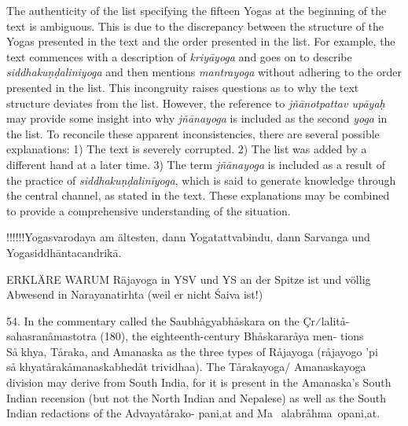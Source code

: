 {The authenticity of the list specifying the fifteen Yogas at the beginning of the text is ambiguous. This is due to the discrepancy between the structure of the Yogas presented in the text and the order presented in the list. For example, the text commences with a description of \textit{kriyāyoga} and goes on to describe \textit{siddhakuṇḍaliniyoga} and then mentions \textit{mantrayoga} without adhering to the order presented in the list. This incongruity raises questions as to why the text structure deviates from the list. However, the reference to \textit{jñānotpattav upāyaḥ} may provide some insight into why \textit{jñānayoga} is included as the second \textit{yoga} in the list. To reconcile these apparent inconsistencies, there are several possible explanations: 1) The text is severely corrupted. 2) The list was added by a different hand at a later time. 3) The term \textit{jñānayoga} is included as a result of the practice of \textit{siddhakuṇḍalinīyoga}, which is said to generate knowledge through the central channel, as stated in the text. These explanations may be combined to provide a comprehensive understanding of the situation.


!!!!!!Yogasvarodaya am ältesten, dann Yogatattvabindu, dann Sarvanga und Yogasiddhāntacandrikā.  

ERKLÄRE WARUM Rājayoga in YSV und YS an der Spitze ist und völlig Abwesend in Narayanatirhta (weil er nicht Śaiva ist!)

54. In the commentary called the Saubhågyabhåskara on the Çr⁄lalitå-
sahasranåmastotra (180), the eighteenth-century Bhåskararåya men-
tions Såkhya, Tåraka, and Amanaska as the three types of Råjayoga
(råjayogo ’pi såkhyatårakåmanaskabhedåt trividhaa). The Tårakayoga/
Amanaskayoga division may derive from South India, for it is present in
the Amanaska’s South Indian recension (but not the North Indian and
Nepalese) as well as the South Indian redactions of the Advayatårako-
pani‚at and Ma~alabråhma~opani‚at.

}
